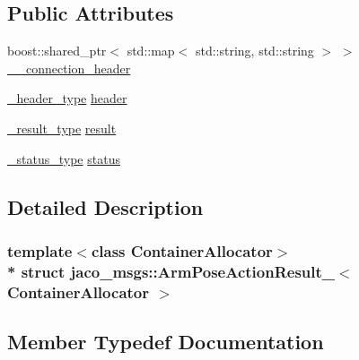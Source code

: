 \subsection*{Public Attributes}
\begin{DoxyCompactItemize}
\item 
boost\+::shared\+\_\+ptr$<$ std\+::map$<$ std\+::string, std\+::string $>$ $>$ \hyperlink{structjaco__msgs_1_1ArmPoseActionResult___a35cba65bda3cd4103d00946921588c46}{\+\_\+\+\_\+connection\+\_\+header}
\item 
\hyperlink{structjaco__msgs_1_1ArmPoseActionResult___accf60f842d4109bd135b54bf14456fe0}{\+\_\+header\+\_\+type} \hyperlink{structjaco__msgs_1_1ArmPoseActionResult___ad9fc777cd6615aa01e98c2c463ea8cfe}{header}
\item 
\hyperlink{structjaco__msgs_1_1ArmPoseActionResult___ae000110dfd7c7cf641eb12b4e92cdfa9}{\+\_\+result\+\_\+type} \hyperlink{structjaco__msgs_1_1ArmPoseActionResult___a9bb1ef2f47899c230eaa740ee2df5b09}{result}
\item 
\hyperlink{structjaco__msgs_1_1ArmPoseActionResult___a3bcda59a5c50ad41670c134e22ea1013}{\+\_\+status\+\_\+type} \hyperlink{structjaco__msgs_1_1ArmPoseActionResult___a8c41477e86f3e0e82044b11667eb0e8f}{status}
\end{DoxyCompactItemize}


\subsection{Detailed Description}
\subsubsection*{template$<$class Container\+Allocator$>$\\*
struct jaco\+\_\+msgs\+::\+Arm\+Pose\+Action\+Result\+\_\+$<$ Container\+Allocator $>$}



\subsection{Member Typedef Documentation}
